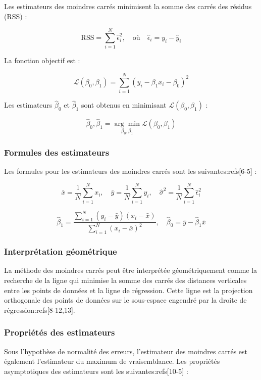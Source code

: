 \documentclass[10pt,a4paper]{article}
\begin{document}
Les estimateurs des moindres carrés minimisent la somme des carrés des résidus (RSS) :

$$
\text{RSS} = \sum_{i=1}^{N} \hat{\epsilon}_i^2, \quad \text{où} \quad \hat{\epsilon}_i = y_i - \hat{y}_i
$$

La fonction objectif est :

$$
\mathcal{L}(\beta_0, \beta_1) = \sum_{i=1}^{N} (y_i - \beta_1 x_i - \beta_0)^2
$$

Les estimateurs $\hat{\beta}_0$ et $\hat{\beta}_1$ sont obtenus en minimisant $\mathcal{L}(\beta_0, \beta_1)$ :

$$
\hat{\beta}_0, \hat{\beta}_1 = \underset{\beta_0, \beta_1}{\arg \min} \mathcal{L}(\beta_0, \beta_1)
$$

\subsubsection*{Formules des estimateurs}

Les formules pour les estimateurs des moindres carrés sont les suivantes:refs[6-5] :

$$
\bar{x} = \frac{1}{N} \sum_{i=1}^{N} x_{i}, \quad \bar{y} = \frac{1}{N} \sum_{i=1}^{N} y_{i}, \quad \hat{\sigma}^{2} = \frac{1}{N} \sum_{i=1}^{N} \hat{\epsilon}_{i}^{2}
$$

$$
\hat{\beta}_{1} = \frac{\sum_{i=1}^{N}(y_{i}-\bar{y})(x_{i}-\bar{x})}{\sum_{i=1}^{N}(x_{i}-\bar{x})^{2}}, \quad \hat{\beta}_{0} = \bar{y} - \hat{\beta}_{1} \bar{x}
$$

\subsubsection*{Interprétation géométrique}

La méthode des moindres carrés peut être interprétée géométriquement comme la recherche de la ligne qui minimise la somme des carrés des distances verticales entre les points de données et la ligne de régression. Cette ligne est la projection orthogonale des points de données sur le sous-espace engendré par la droite de régression:refs[8-12,13].



\subsubsection*{Propriétés des estimateurs}

Sous l'hypothèse de normalité des erreurs, l'estimateur des moindres carrés est également l'estimateur du maximum de vraisemblance. Les propriétés asymptotiques des estimateurs sont les suivantes:refs[10-5] :
\end{document}
